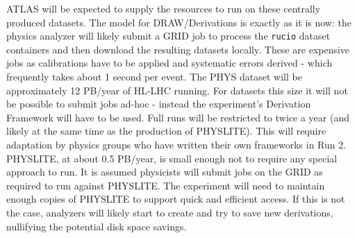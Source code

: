 ATLAS will be expected to supply the resources to run on these centrally produced datasets. The model for DRAW/Derivations is exactly as it is now: the physics analyzer will likely submit a GRID job to process the {\tt rucio} dataset containers and then download the resulting datasets locally. These are expensive jobs as calibrations have to be applied and systematic errors derived - which frequently takes about 1 second per event. The PHYS dataset will be approximately 12 PB/year of HL-LHC running. For datasets this size it will not be possible to submit jobs ad-hoc - instead the experiment's Derivation Framework will have to be used. Full runs will be restricted to twice a year (and likely at the same time as the production of PHYSLITE). This will require adaptation by physics groups who have written their own frameworks in Run 2. PHYSLITE, at about 0.5 PB/year, is small enough not to require any special approach to run. It is assumed physicists will submit jobs on the GRID as required to run against PHYSLITE. The experiment will need to maintain enough copies of PHYSLITE to support quick and efficient access. If this is not the case, analyzers will likely start to create and try to save new derivations, nullifying the potential disk space savings.




